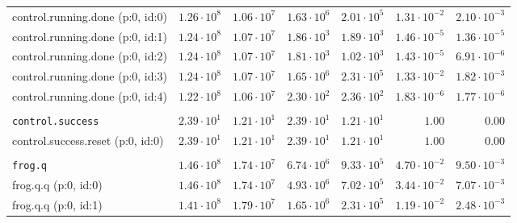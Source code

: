 \begin{table}[htbp]
{\begin{tabular}{lrrrrrr}
\hspace{3mm}control.running.done (p:0, id:0)  & $1.26 \cdot 10^{8}$ & $1.06 \cdot 10^{7}$ & $1.63 \cdot 10^{6}$ & $2.01 \cdot 10^{5}$ & $1.31 \cdot 10^{-2}$ & $2.10 \cdot 10^{-3}$ \\
\hspace{3mm}control.running.done (p:0, id:1)  & $1.24 \cdot 10^{8}$ & $1.07 \cdot 10^{7}$ & $1.86 \cdot 10^{3}$ & $1.89 \cdot 10^{3}$ & $1.46 \cdot 10^{-5}$ & $1.36 \cdot 10^{-5}$ \\
\hspace{3mm}control.running.done (p:0, id:2)  & $1.24 \cdot 10^{8}$ & $1.07 \cdot 10^{7}$ & $1.81 \cdot 10^{3}$ & $1.02 \cdot 10^{3}$ & $1.43 \cdot 10^{-5}$ & $6.91 \cdot 10^{-6}$ \\
\hspace{3mm}control.running.done (p:0, id:3)  & $1.24 \cdot 10^{8}$ & $1.07 \cdot 10^{7}$ & $1.65 \cdot 10^{6}$ & $2.31 \cdot 10^{5}$ & $1.33 \cdot 10^{-2}$ & $1.82 \cdot 10^{-3}$ \\
\hspace{3mm}control.running.done (p:0, id:4)  & $1.22 \cdot 10^{8}$ & $1.06 \cdot 10^{7}$ & $2.30 \cdot 10^{2}$ & $2.36 \cdot 10^{2}$ & $1.83 \cdot 10^{-6}$ & $1.77 \cdot 10^{-6}$ \\
\\[-8pt]\texttt{control.success}              & $2.39 \cdot 10^{1}$ & $1.21 \cdot 10^{1}$ & $2.39 \cdot 10^{1}$ & $1.21 \cdot 10^{1}$ &               $1.00$ &               $0.00$ \\
\hspace{3mm}control.success.reset (p:0, id:0) & $2.39 \cdot 10^{1}$ & $1.21 \cdot 10^{1}$ & $2.39 \cdot 10^{1}$ & $1.21 \cdot 10^{1}$ &               $1.00$ &               $0.00$ \\
\\[-8pt]\texttt{frog.q}                       & $1.46 \cdot 10^{8}$ & $1.74 \cdot 10^{7}$ & $6.74 \cdot 10^{6}$ & $9.33 \cdot 10^{5}$ & $4.70 \cdot 10^{-2}$ & $9.50 \cdot 10^{-3}$ \\
\hspace{3mm}frog.q.q (p:0, id:0)              & $1.46 \cdot 10^{8}$ & $1.74 \cdot 10^{7}$ & $4.93 \cdot 10^{6}$ & $7.02 \cdot 10^{5}$ & $3.44 \cdot 10^{-2}$ & $7.07 \cdot 10^{-3}$ \\
\hspace{3mm}frog.q.q (p:0, id:1)              & $1.41 \cdot 10^{8}$ & $1.79 \cdot 10^{7}$ & $1.65 \cdot 10^{6}$ & $2.31 \cdot 10^{5}$ & $1.19 \cdot 10^{-2}$ & $2.48 \cdot 10^{-3}$ \\

\end{tabular}}
\end{table}
